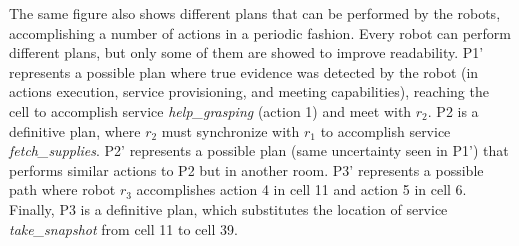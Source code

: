The same figure also shows different plans that can be performed by the robots, accomplishing a number of actions in a periodic fashion.
Every robot can perform different plans, but only some of them are showed to improve readability.
P1' represents a possible plan where  true evidence was detected by the robot (in actions execution, service provisioning, and meeting capabilities), reaching the cell to accomplish service \emph{help\_grasping} (action 1) and meet with $r_2$.
P2 is a definitive plan,  where $r_2$ must synchronize with $r_1$ to accomplish service \emph{fetch\_supplies}.
P2' represents a possible plan (same uncertainty seen in P1') that performs similar actions to P2 but in another room.
P3' represents a possible path where robot $r_3$ accomplishes action 4 in cell 11 and action 5 in cell 6.
Finally, P3 is a definitive plan, which substitutes the location of service \emph{take\_snapshot} from cell 11 to cell 39.






